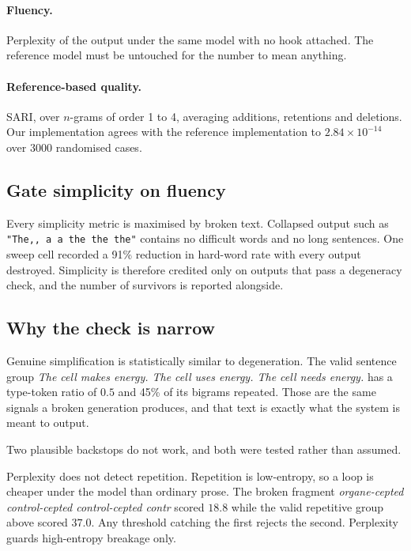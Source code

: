 \documentclass[twocolumn,10pt,a4paper]{article}
\newcommand{\code}[1]{\texttt{\small #1}}
\begin{document}
\paragraph{Fluency.} Perplexity of the output under the same model with no hook
attached. The reference model must be untouched for the number to mean anything.

\paragraph{Reference-based quality.} SARI, over $n$-grams of order 1 to 4,
averaging additions, retentions and deletions. Our implementation agrees with the
reference implementation to $2.84\times10^{-14}$ over 3000 randomised cases.

\subsection{Gate simplicity on fluency}

Every simplicity metric is maximised by broken text. Collapsed output such as
\code{"The,, a a the the the"} contains no difficult words and no long sentences.
One sweep cell recorded a 91\% reduction in hard-word rate with every output
destroyed. Simplicity is therefore credited only on outputs that pass a
degeneracy check, and the number of survivors is reported alongside.

\subsection{Why the check is narrow}

Genuine simplification is statistically similar to degeneration. The valid
sentence group \emph{The cell makes energy. The cell uses energy. The cell needs
energy.} has a type-token ratio of $0.5$ and 45\% of its bigrams repeated. Those
are the same signals a broken generation produces, and that text is exactly what
the system is meant to output.

Two plausible backstops do not work, and both were tested rather than assumed.

Perplexity does not detect repetition. Repetition is low-entropy, so a loop is
cheaper under the model than ordinary prose. The broken fragment
\emph{organe-cepted control-cepted control-cepted contr} scored $18.8$ while the
valid repetitive group above scored $37.0$. Any threshold catching the first
rejects the second. Perplexity guards high-entropy breakage only.
\end{document}
